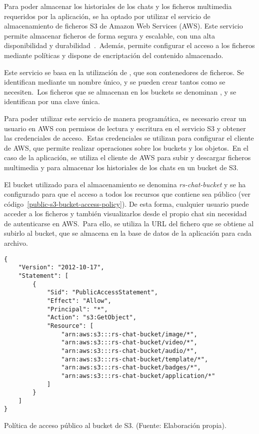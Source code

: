 
Para poder almacenar los historiales de los chats y los ficheros multimedia requeridos por la aplicación, se ha
optado por utilizar el servicio de almacenamiento de ficheros S3 de Amazon Web Services (AWS).
Este servicio permite almacenar ficheros de forma segura y escalable, con una alta disponibilidad
y durabilidad~\cite{AWSAlmac67:online}.\ Además, permite configurar el acceso a los ficheros mediante políticas
y dispone de encriptación del contenido almacenado.

Este servicio se basa en la utilización de , que son contenedores de ficheros.
Se identifican mediante un nombre único, y se pueden crear tantos como se necesiten.\ Los ficheros que se almacenan
en los buckets se denominan , y se identifican por una clave única.

Para poder utilizar este servicio de manera programática, es necesario crear un usuario en AWS con permisos de lectura
y escritura en el servicio S3 y obtener las credenciales de acceso.\ Estas credenciales se utilizan para configurar
el cliente de AWS, que permite realizar operaciones sobre los buckets y los objetos.\ En el caso de la aplicación,
se utiliza el cliente de AWS para subir y descargar ficheros multimedia y para almacenar los historiales de los
chats en un bucket de S3.

El bucket utilizado para el almacenamiento se denomina \textit{rs-chat-bucket} y se ha configurado para que el acceso
a todos los recursos que contiene sea público (ver código~\ref{public-s3-bucket-access-policy}).
De esta forma, cualquier usuario puede acceder a los ficheros y también
visualizarlos desde el propio chat sin necesidad de autenticarse en AWS.\ Para ello, se utiliza la URL del fichero
que se obtiene al subirlo al bucket, que se almacena en la base de datos de la aplicación para cada archivo.

\begin{codeBlock}
	\begin{verbatim}
{
    "Version": "2012-10-17",
    "Statement": [
        {
            "Sid": "PublicAccessStatement",
            "Effect": "Allow",
            "Principal": "*",
            "Action": "s3:GetObject",
            "Resource": [
                "arn:aws:s3:::rs-chat-bucket/image/*",
                "arn:aws:s3:::rs-chat-bucket/video/*",
                "arn:aws:s3:::rs-chat-bucket/audio/*",
                "arn:aws:s3:::rs-chat-bucket/template/*",
                "arn:aws:s3:::rs-chat-bucket/badges/*",
                "arn:aws:s3:::rs-chat-bucket/application/*"
            ]
        }
    ]
}
	\end{verbatim}
	\caption{Política de acceso público al bucket de S3. (Fuente: Elaboración propia).}
	\label{public-s3-bucket-access-policy}
\end{codeBlock}


